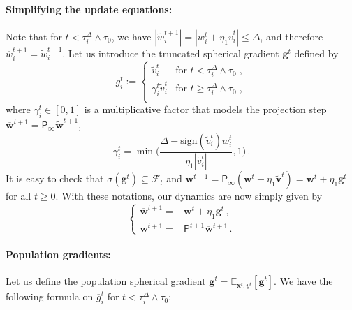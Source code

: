 \documentclass[11pt]{article}
\newcommand{\E}{\mathbb{E}}
\newcommand{\<}{\langle}
\renewcommand{\>}{\rangle}
\newcommand{\sign}{\text{sign}}
\theoremstyle{definition}
\def\bg{{\boldsymbol g}}
\def\bv{{\boldsymbol v}}
\def\bw{{\boldsymbol w}}
\def\bx{{\boldsymbol x}}
\def\cF{{\mathcal F}}
\def\proj{{\mathsf P}}
\def\proj{{\mathsf P}}
\def\proj{{\mathsf P}}
\def\proj{{\mathsf P}}
\def\proj{{\mathsf P}}
\def\bg{{\boldsymbol g}}
\def\bv{{\boldsymbol v}}
\def\bw{{\boldsymbol w}}
\def\bx{{\boldsymbol x}}
\def\cF{{\mathcal F}}
\def\proj{{\mathsf P}}
\def\bg{{\boldsymbol g}}
\def\bg{{\boldsymbol g}}
\def\tbw{\widetilde \bw}
\def\obg{\overline{\bg}}
\def\og{\overline{g}}
\def\obw{\overline{\bw}}
\def\tbw{\widetilde{\bw}}
\def\tbv{\widetilde{\bv}}
\def\tv{\widetilde{v}}
\def\tw{\widetilde{w}}
\def\ow{\overline{w}}
\begin{document}
\paragraph*{Simplifying the update equations:} Note that for $t < \tau_i^\Delta \wedge \tau_0$, we have $|\tw_i^{t+1}| = |w_i^t + \eta_1 \tv_i^t | \leq \Delta$, and therefore $\ow_i^{t+1} = \tw_i^{t+1}$.  Let us introduce the truncated spherical gradient $\bg^t$ defined by
\[
g^t_i := \begin{cases}
    \tv_i^t & \text{for $t < \tau_i^\Delta \wedge \tau_0$}\; , \\
    \gamma_i^t \tv_i^t & \text{for $t \geq \tau_i^\Delta \wedge \tau_0$}\; , \\
\end{cases}
\]
where $\gamma_i^t \in [0,1]$ is a multiplicative factor that models the projection step $\obw^{t+1} = \proj_{\infty} \tbw^{t+1}$,
\[
\gamma_i^t = \min \Big( \frac{\Delta - \sign ( \tv_i^t ) w_i^t }{\eta_1 | \tv_i^t | }, 1 \Big) \, .
\]
It is easy to check that $\sigma (\bg^t) \subseteq \cF_t$ and $\obw^{t+1} = \proj_{\infty} ( \bw^t + \eta_1 \tbv^t ) = \bw^t + \eta_1 \bg^t$ for all $t \geq 0$. With these notations, our dynamics are now simply given by
\begin{equation}\label{eq:dyn_eq_simplified}
\begin{cases}
\obw^{t+1} =& \bw^t + \eta_1 \bg^t \, ,\\
\bw^{t+1} = & \proj^{t+1} \obw^{t+1}    \, .
\end{cases}
\end{equation}

\paragraph*{Population gradients:} Let us define the population spherical gradient $\obg^t = \E_{\bx^t,y^t} [\bg^t ]$. We have the following formula on $\og_i^t$ for $t < \tau_i^\Delta \wedge \tau_0$:
\end{document}
